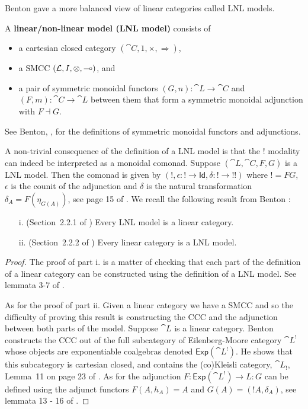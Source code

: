 Benton gave a more balanced view of linear categories called LNL
models.
\begin{definition}
  \label{def:LNL-model}
  A \textbf{linear/non-linear model (LNL model)} consists of
  \begin{itemize}
  \item a cartesian closed category $(\cat{C}, 1, \times,
    \Rightarrow)$,
  \item a SMCC $(\mathcal{L},I,\otimes,\multimap)$, and
  \item a pair of symmetric monoidal functors $(G,n) : \cat{L} \to
    \cat{C}$ and $(F,m) : \cat{C} \to \cat{L}$ between them that form
    a symmetric monoidal adjunction with $F \dashv G$.
  \end{itemize}
  See Benton, \cite{Benton:1994}, for the definitions of symmetric
  monoidal functors and adjunctions.
\end{definition}
A non-trivial consequence of the definition of a LNL model is that the
$!$ modality can indeed be interpreted as a monoidal comonad.  Suppose
$(\cat{L}, \cat{C},F,G)$ is a LNL model. Then the comonad is given by
$(\mathop{!}, \epsilon : \mathop{!} \to \mathsf{Id}, \delta :
\mathop{!} \to \mathop{!!})$
where $! = FG$, $\epsilon$ is the counit of the adjunction and
$\delta$ is the natural transformation $\delta_A = F(\eta_{G(A)})$,
see page 15 of \cite{Benton:1994}.  We recall the following result
from Benton \cite{Benton:1994}:
\begin{theorem}
  \label{thm:lnl_models_are_linear_categories}
  \begin{itemize}
  \item[]
  \item[i.] (Section~2.2.1 of \cite{Benton:1994}) Every LNL model is a linear category.
  \item[ii.] (Section~2.2.2 of \cite{Benton:1994}) Every linear category is a LNL model.
  \end{itemize}
\end{theorem}
\begin{proof}
  The proof of part i. is a matter of checking that each part of the
  definition of a linear category can be constructed using the
  definition of a LNL model. See lemmata 3-7 of \cite{Benton:1994}.

  As for the proof of part ii. Given a linear category we have a SMCC and so the difficulty of
  proving this result is constructing the CCC and the adjunction
  between both parts of the model.  Suppose $\cat{L}$ is a linear
  category.  Benton constructs the CCC out of the full subcategory of
  Eilenberg-Moore category $\cat{L}^!$ whose objects are exponentiable
  coalgebras denoted $\mathsf{Exp}(\cat{L}^!)$.  He shows that
  this subcategory is cartesian closed, and contains the (co)Kleisli
  category, $\cat{L}_!$, Lemma~11 on page 23 of \cite{Benton:1994}.
  As for the adjunction
  $F : \mathsf{Exp}(\cat{L}^!) \to L : G$ can be defined using the
  adjunct functors $F(A,h_A) = A$ and $G(A) = (!A,\delta_A)$, see
  lemmata 13 - 16 of \cite{Benton:1994}.
\end{proof}

